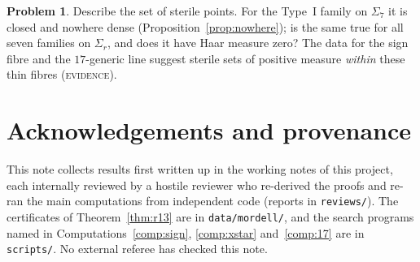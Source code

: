 \documentclass[11pt,reqno]{amsart}
\theoremstyle{definition}
\newtheorem{problem}{Problem}
\newcommand{\status}[1]{\textup{\textsc{#1}}}
\begin{document}
\begin{problem}
Describe the set of sterile points.  For the Type~I family on
$\Sigma_7$ it is closed and nowhere dense (Proposition~\ref{prop:nowhere});
is the same true for all seven families on $\Sigma_r$, and does it have
Haar measure zero?  The data for the sign fibre and the $17$-generic line
suggest sterile sets of positive measure \emph{within} these thin fibres
(\status{evidence}).
\end{problem}

\section*{Acknowledgements and provenance}
This note collects results first written up in the working notes
\cite{PS,PT1,PT2,PT3,PT4,PT5,PT6,PM,PM13B,PM13C,PM17,PM17B,PM17C} of this project, each internally reviewed
by a hostile reviewer who re-derived the proofs and re-ran the main
computations from independent code (reports in \texttt{reviews/}).  The
certificates of Theorem~\ref{thm:r13} are in \texttt{data/mordell/}, and
the search programs named in Computations~\ref{comp:sign}, \ref{comp:xstar}
and~\ref{comp:17} are in \texttt{scripts/}.  No external referee has
checked this note.
\end{document}
